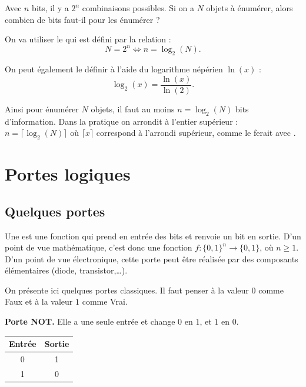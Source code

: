 \documentclass[11pt,class=report,crop=false]{standalone}
\begin{document}
Avec $n$ bits, il y a $2^n$ combinaisons possibles.
Si on a $N$ objets à énumérer, alors combien de bits faut-il pour les énumérer ?

On va utiliser le  qui est défini par la relation :
$$N = 2^n \iff n = \log_2(N).$$

On peut également le définir à l'aide du logarithme népérien $\ln(x)$ :
$$\log_2(x) = \frac{\ln(x)}{\ln(2)}.$$

Ainsi pour énumérer $N$ objets, il faut au moins $n = \log_2(N)$ bits d'information. 
Dans la pratique on arrondit à l'entier supérieur : $n = \lceil \log_2(N) \rceil$ 
où $ \lceil x \rceil$ correspond à l'arrondi supérieur, comme le ferait  avec \Python.




\section{Portes logiques}


\subsection{Quelques portes}

Une  est une fonction qui prend en entrée des bits et renvoie un bit en sortie. 
D'un point de vue mathématique, c'est donc une fonction $f : \{0,1\}^n \to \{0,1\}$, où $n\ge1$.
D'un point de vue électronique, cette porte peut être réalisée par des composants élémentaires (diode, transistor,\ldots).

On présente ici quelques portes classiques. 
Il faut penser à la valeur $0$ comme \og{}Faux\fg{} et à la valeur $1$ comme \og{}Vrai\fg{}.

\textbf{Porte NOT.}
Elle a une seule entrée et change $0$ en $1$, et $1$ en $0$.




\begin{center}
\begin{tabular}{|c|c|}
\hline
Entrée &  Sortie \\ \hline\hline
0 & 1 \\
1 & 0 \\ \hline
\end{tabular}
\end{center}
\end{document}

